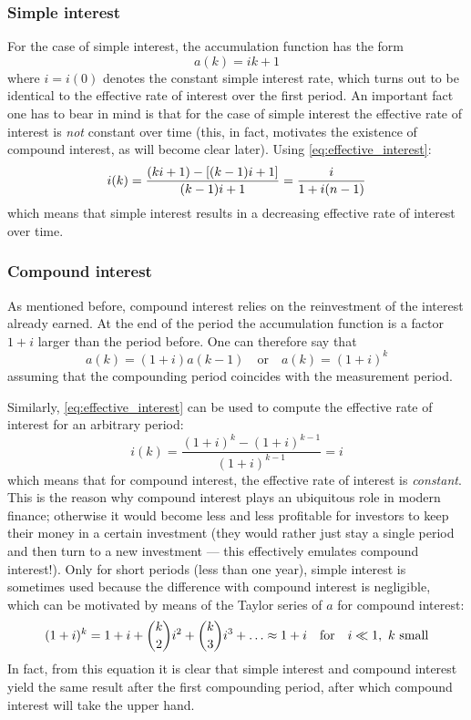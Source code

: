 \subsubsection{Simple interest}
For the case of simple interest, the accumulation function has the form
\[
     a(k) = ik + 1
\] 
where \(i = i(0)\) denotes the constant simple interest rate, which turns out to be identical to the effective rate of interest over the first period. An important fact one has to bear in mind is that for the case of simple interest the effective rate of interest is \emph{not} constant over time (this, in fact, motivates the existence of compound interest, as will become clear later). Using \cref{eq:effective_interest}:
\[
     i(k) = \frac{\qty(ki + 1) - \qty[(k-1)i + 1]}{(k-1)i + 1} = \frac{i}{1 + i(n-1)}
\]
which means that simple interest results in a decreasing effective rate of interest over time. \cite{Kellison1991}

\subsubsection{Compound interest}
As mentioned before, compound interest relies on the reinvestment of the interest already earned. At the end of the period the accumulation function is a factor \(1 + i\) larger than the period before. One can therefore say that
\[
     a(k) = (1 + i)a(k-1)\quad\text{or}\quad a(k) = (1 + i)^{k}
\]
assuming that the compounding period coincides with the measurement period. 

Similarly, \cref{eq:effective_interest} can be used to compute the effective rate of interest for an arbitrary period:
\[
     i(k) = \frac{(1 + i)^k - (1 + i)^{k-1}}{(1 + i)^{k-1}} = i
\]
which means that for compound interest, the effective rate of interest is \emph{constant}. This is the reason why compound interest plays an ubiquitous role in modern finance; otherwise it would become less and less profitable for investors to keep  their money in a certain investment (they would rather just stay a single period and then turn to a new investment --- this effectively emulates compound interest!). Only for short periods (less than one year), simple interest is sometimes used because the difference with compound interest is negligible, which can be motivated by means of the Taylor series of \(a\) for compound interest: 
\[
     (1 + i)^k = 1 + i +  \binom{k}{2}i^2 + \binom{k}{3}i^3 + \ldots \approx 1 + i\qfor i \ll 1,\ k \text{ small}
\]
In fact, from this equation it is clear that simple interest and compound interest yield the same result after the first compounding period, after which compound interest will take the upper hand.

